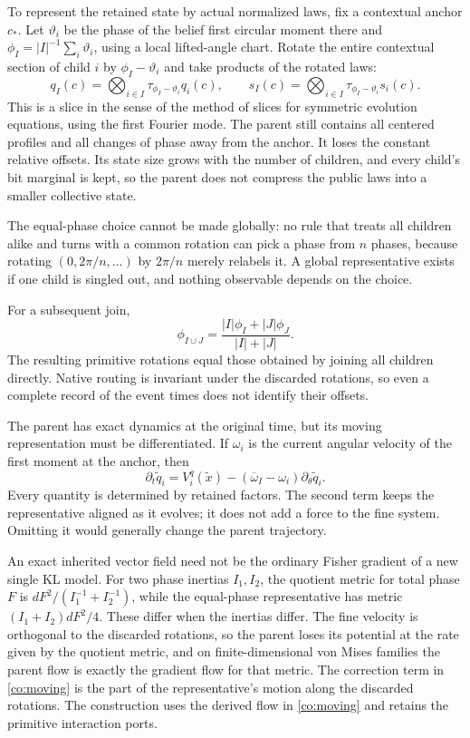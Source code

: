 To represent the retained state by actual normalized laws, fix a contextual anchor $c_*$. Let $\vartheta_i$ be the phase of the belief first circular moment there and $\phi_I=|I|^{-1}\sum_i\vartheta_i$, using a local lifted-angle chart. Rotate the entire contextual section of child $i$ by $\phi_I-\vartheta_i$ and take products of the rotated laws:
\begin{equation}
q_I(c)=\bigotimes_{i\in I}\tau_{\phi_I-\vartheta_i}q_i(c),
\qquad
s_I(c)=\bigotimes_{i\in I}\tau_{\phi_I-\vartheta_i}s_i(c).
\label{co:parent}
\end{equation}
This is a slice in the sense of the method of slices for symmetric evolution equations, using the first Fourier mode. The parent still contains all centered profiles and all changes of phase away from the anchor. It loses the constant relative offsets. Its state size grows with the number of children, and every child's bit marginal is kept, so the parent does not compress the public laws into a smaller collective state.

The equal-phase choice cannot be made globally: no rule that treats all children alike and turns with a common rotation can pick a phase from $n$ phases, because rotating $(0,2\pi/n,\ldots)$ by $2\pi/n$ merely relabels it. A global representative exists if one child is singled out, and nothing observable depends on the choice.

For a subsequent join,
\begin{equation}
\phi_{I\cup J}=\frac{|I|\phi_I+|J|\phi_J}{|I|+|J|}.
\end{equation}
The resulting primitive rotations equal those obtained by joining all children directly. Native routing is invariant under the discarded rotations, so even a complete record of the event times does not identify their offsets.

The parent has exact dynamics at the original time, but its moving representation must be differentiated. If $\omega_i$ is the current angular velocity of the first moment at the anchor, then
\begin{equation}
\partial_t\widetilde q_i
=V_i^q(\widetilde x)
-(\overline\omega_I-\omega_i)\partial_\theta\widetilde q_i.
\label{co:moving}
\end{equation}
Every quantity is determined by retained factors. The second term keeps the representative aligned as it evolves; it does not add a force to the fine system. Omitting it would generally change the parent trajectory.

An exact inherited vector field need not be the ordinary Fisher gradient of a new single KL model. For two phase inertias $I_1,I_2$, the quotient metric for total phase $F$ is $dF^2/(I_1^{-1}+I_2^{-1})$, while the equal-phase representative has metric $(I_1+I_2)dF^2/4$. These differ when the inertias differ. The fine velocity is orthogonal to the discarded rotations, so the parent loses its potential at the rate given by the quotient metric, and on finite-dimensional von Mises families the parent flow is exactly the gradient flow for that metric. The correction term in \cref{co:moving} is the part of the representative's motion along the discarded rotations. The construction uses the derived flow in \cref{co:moving} and retains the primitive interaction ports.

